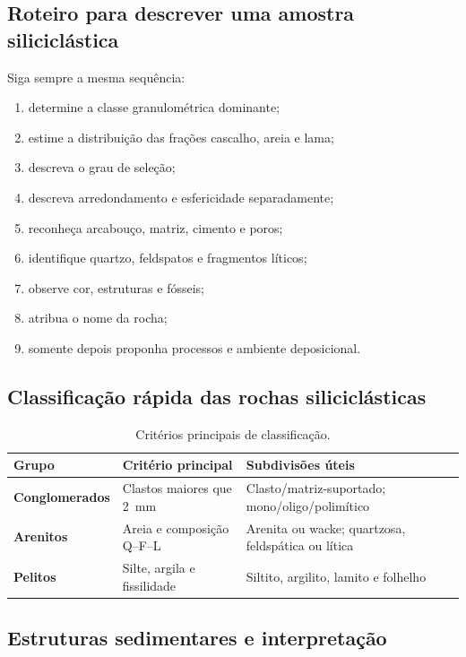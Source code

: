\subsection{Roteiro para descrever uma amostra siliciclástica}

Siga sempre a mesma sequência:

\begin{enumerate}
  \item determine a classe granulométrica dominante;
  \item estime a distribuição das frações cascalho, areia e lama;
  \item descreva o grau de seleção;
  \item descreva arredondamento e esfericidade separadamente;
  \item reconheça arcabouço, matriz, cimento e poros;
  \item identifique quartzo, feldspatos e fragmentos líticos;
  \item observe cor, estruturas e fósseis;
  \item atribua o nome da rocha;
  \item somente depois proponha processos e ambiente deposicional.
\end{enumerate}

\subsection{Classificação rápida das rochas siliciclásticas}

\begin{table}[H]
  \centering
  \caption{Critérios principais de classificação.}
  \begin{tabularx}{\textwidth}{>{\bfseries}lXX}
    \toprule
    Grupo & Critério principal & Subdivisões úteis \\
    \midrule
    Conglomerados & Clastos maiores que \SI{2}{\milli\metre} & Clasto/matriz-suportado; mono/oligo/polimítico \\
    Arenitos & Areia e composição Q--F--L & Arenita ou wacke; quartzosa, feldspática ou lítica \\
    Pelitos & Silte, argila e fissilidade & Siltito, argilito, lamito e folhelho \\
    \bottomrule
  \end{tabularx}
\end{table}

\subsection{Estruturas sedimentares e interpretação}

